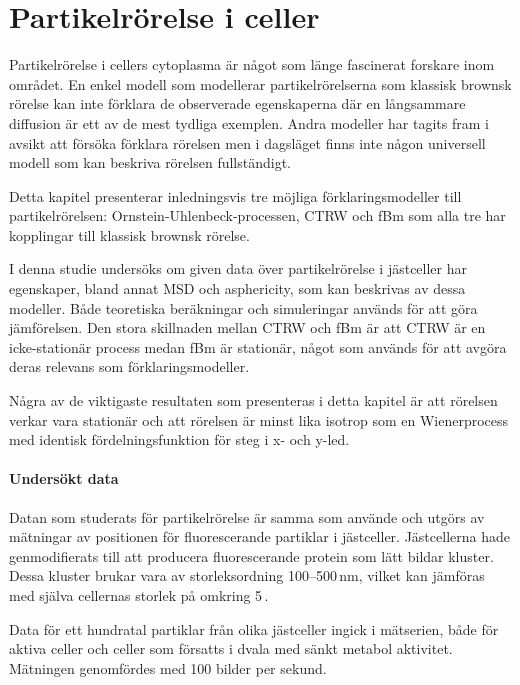 \chapter{Partikelrörelse i celler}

Partikelrörelse i cellers cytoplasma är något som länge fascinerat forskare inom området. En enkel modell som modellerar partikelrörelserna som klassisk brownsk rörelse kan inte förklara de observerade egenskaperna där en långsammare diffusion är ett av de mest tydliga exemplen. Andra modeller har tagits fram i avsikt att försöka förklara rörelsen men i dagsläget finns inte någon universell modell som kan beskriva rörelsen fullständigt. 

Detta kapitel presenterar inledningsvis tre möjliga förklaringsmodeller till partikelrörelsen:  Ornstein-Uhlenbeck-processen, CTRW och fBm som alla tre har kopplingar till klassisk brownsk rörelse. 

I denna studie undersöks om given data över partikelrörelse i jästceller har egenskaper, bland annat MSD och asphericity, som kan beskrivas av dessa modeller. Både teoretiska beräkningar och simuleringar används för att göra jämförelsen. Den stora skillnaden mellan CTRW och fBm är att CTRW är en icke-stationär process medan fBm är stationär, något som används för att avgöra deras relevans som förklaringsmodeller. 

Några av de viktigaste resultaten som presenteras i detta kapitel är att rörelsen verkar vara stationär och att rörelsen är minst lika isotrop som en Wienerprocess med identisk fördelningsfunktion för steg i x- och y-led. 



\subsubsection{Undersökt data}
Datan som studerats för partikelrörelse är samma som \cite{Midtveldt_etal2016} använde och utgörs av mätningar av positionen för fluorescerande partiklar i jästceller. Jästcellerna hade genmodifierats till att producera fluorescerande protein som lätt bildar kluster. Dessa kluster brukar vara av storleksordning 100--500\,nm, vilket kan jämföras med själva cellernas storlek på omkring 5\,.

Data för ett hundratal partiklar från olika jästceller ingick i mätserien, både för aktiva celler och celler som försatts i dvala med sänkt metabol aktivitet. Mätningen genomfördes med 100 bilder per sekund.



